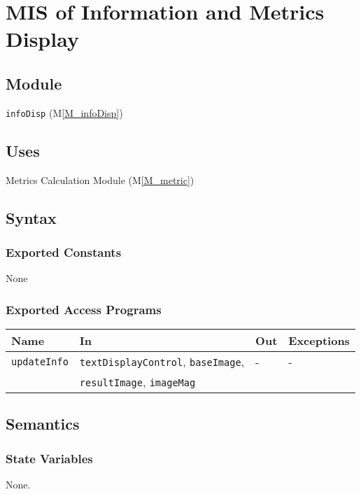 \documentclass[12pt, titlepage]{article}
\newcommand{\mref}[1]{M\ref{#1}}
\newcommand{\mrefp}[1]{(\mref{#1})}
\newcommand{\mreff}[1]{Module \mrefp{#1}}
\newcommand{\code}[1]{\texttt{#1}}
\begin{document}
\newpage


\section{MIS of Information and Metrics Display} \label{MS_infoDisp}

\subsection{Module}
\code{infoDisp} \mrefp{M_infoDisp}

\subsection{Uses}
Metrics Calculation \mreff{M_metric}

\subsection{Syntax}

\subsubsection{Exported Constants}
None

\subsubsection{Exported Access Programs}

\begin{center}
\begin{tabular}{p{2cm} p{7cm} p{1cm} p{4cm}}
\hline
\textbf{Name} & \textbf{In} & \textbf{Out} & \textbf{Exceptions} \\
\hline
\code{updateInfo} & \code{textDisplayControl}, \code{baseImage}, & - & - \\
                  & \code{resultImage}, \code{imageMag} \\
\hline
\end{tabular}
\end{center}

\subsection{Semantics}

\subsubsection{State Variables}
None.
\end{document}
